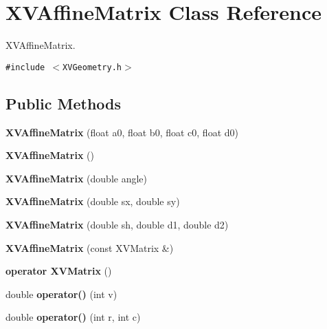 \hypertarget{class_XVAffineMatrix}{
\section{XVAffine\-Matrix  Class Reference}
\label{XVAffineMatrix}
}
XVAffine\-Matrix. 


{\tt \#include $<$XVGeometry.h$>$}

\subsection*{Public Methods}
\begin{CompactItemize}
\item 
{\bf XVAffine\-Matrix} (float a0, float b0, float c0, float d0)
\item 
{\bf XVAffine\-Matrix} ()
\item 
\label{XVAffineMatrix_a2}
\hypertarget{class_XVAffineMatrix_a2}{
{\bf XVAffine\-Matrix} (double angle)}

\item 
{\bf XVAffine\-Matrix} (double sx, double sy)
\item 
{\bf XVAffine\-Matrix} (double sh, double d1, double d2)
\item 
\label{XVAffineMatrix_a5}
\hypertarget{class_XVAffineMatrix_a5}{
{\bf XVAffine\-Matrix} (const XVMatrix \&)}

\item 
\label{XVAffineMatrix_a6}
\hypertarget{class_XVAffineMatrix_a6}{
{\bf operator XVMatrix} ()}

\item 
\label{XVAffineMatrix_a7}
\hypertarget{class_XVAffineMatrix_a7}{
double {\bf operator()} (int v)}

\item 
\label{XVAffineMatrix_a8}
\hypertarget{class_XVAffineMatrix_a8}{
double {\bf operator()} (int r, int c)}


\end{CompactItemize}
